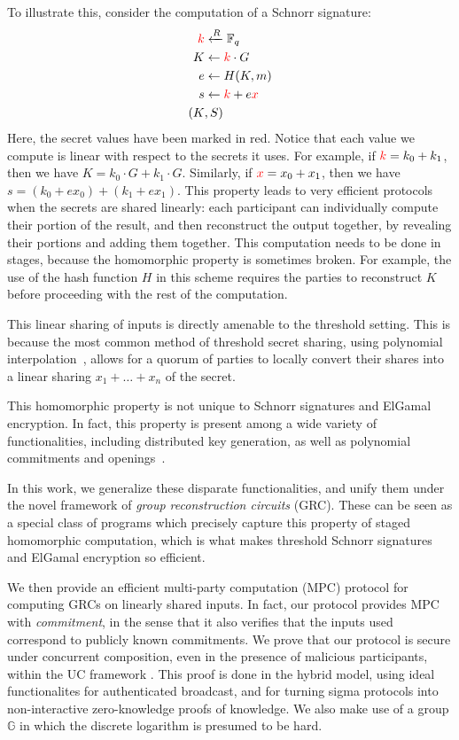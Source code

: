 To illustrate this, consider the computation of a Schnorr signature:
$$
\begin{aligned}
\textcolor{red}{k} &\xleftarrow{R} \mathbb{F}_q\\
K &\gets \textcolor{red}{k} \cdot G\\
e &\gets H(K, m)\\
s &\gets \textcolor{red}{k} + e \textcolor{red}{x}\\
(K&, S)
\end{aligned}
$$
Here, the secret values have been marked in red.
Notice that each value we compute is linear with respect
to the secrets it uses.
For example, if $\textcolor{red}{k} = k_0 + k_1$,
then we have $K = k_0 \cdot G + k_1 \cdot G$.
Similarly, if $\textcolor{red}{x} = x_0 + x_1$, then
we have $s = (k_0 + e x_0) + (k_1 + e x_1)$.
This property leads to very efficient protocols when the
secrets are shared linearly:
each participant can individually compute their portion of the result,
and then reconstruct the output together, by revealing
their portions and adding them together.
This computation needs to be done in stages, because the
homomorphic property is sometimes broken.
For example, the use of the hash function $H$ in this
scheme requires the parties to reconstruct $K$ before proceeding
with the rest of the computation.

This linear sharing of inputs is directly amenable to the threshold
setting.
This is because
the most common method of threshold secret sharing,
using polynomial interpolation~\cite{shamir1979share},
allows for a quorum of parties to locally convert their shares
into a linear sharing $x_1 + \ldots + x_n$ of the secret.

This homomorphic property is not unique to Schnorr signatures
and ElGamal encryption.
In fact, this property is present among a wide variety
of functionalities, including distributed key generation,
as well as polynomial commitments and openings~\cite{kate_constant-size_2010}.

In this work, we generalize these disparate functionalities,
and unify them under the novel framework of
\emph{group reconstruction circuits} (GRC).
These can be seen as a special class of programs which precisely
capture this property of staged homomorphic computation,
which is what makes threshold Schnorr signatures and
ElGamal encryption so efficient.

We then provide an efficient multi-party computation (MPC) protocol
for computing GRCs on linearly shared inputs.
In fact, our protocol provides MPC with \emph{commitment},
in the sense that it also verifies that the inputs
used correspond to publicly known commitments.
We prove that our protocol is secure under concurrent composition,
even in the presence of malicious participants,
within the UC framework \cite{canetti2001universally}.
This proof is done in the hybrid model,
using ideal functionalites for authenticated broadcast,
and for turning sigma protocols into non-interactive zero-knowledge
proofs of knowledge.
We also make use of a group $\mathbb{G}$ in which the discrete
logarithm is presumed to be hard.

